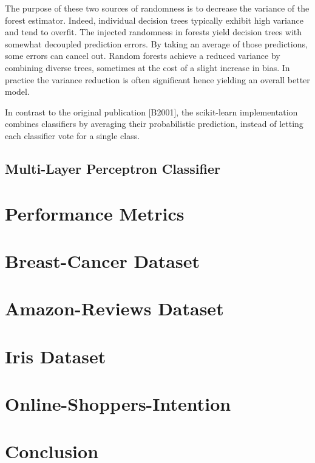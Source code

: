 \documentclass{article}
\begin{document}
The purpose of these two sources of randomness is to decrease the variance of the forest estimator. Indeed, individual decision trees typically exhibit high variance and tend to overfit. The injected randomness in forests yield decision trees with somewhat decoupled prediction errors. By taking an average of those predictions, some errors can cancel out. Random forests achieve a reduced variance by combining diverse trees, sometimes at the cost of a slight increase in bias. In practice the variance reduction is often significant hence yielding an overall better model.

In contrast to the original publication [B2001], the scikit-learn implementation combines classifiers by averaging their probabilistic prediction, instead of letting each classifier vote for a single class.

\subsection{Multi-Layer Perceptron Classifier}

\section{Performance Metrics}

\section{Breast-Cancer Dataset}


\section{Amazon-Reviews Dataset}


\section{Iris Dataset}


\section{Online-Shoppers-Intention}


\section{Conclusion}
\end{document}
